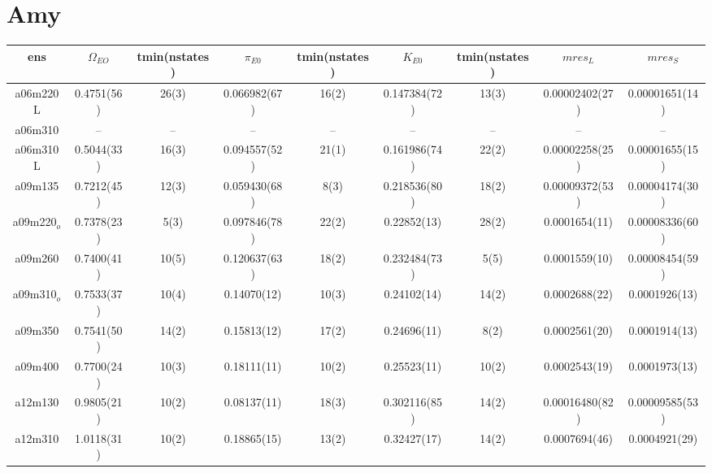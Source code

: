 \documentclass{article}
\begin{document}
\section*{Amy}
 \begin{table}[h!]
  \centering
 \setlength{\arrayrulewidth}{0.5mm}
\setlength{\tabcolsep}{13pt}
\renewcommand{\arraystretch}{2}
 \begin{tabular}{|| c |c | c | c | c | c | c | c | c ||} 
 \hline
 ens &  $\Omega_{EO}$ & tmin(nstates) & $\pi_{E0}$  & tmin(nstates)& $K_{E0}$  & tmin(nstates) & $mres_{L}$ & $mres_{S}$\\ [0.8ex] 
 \hline\hline
 a06m220L 
 & {0.4751(56)}   &   {26(3)} & {0.066982(67)}   & {16(2)}   & {0.147384(72)}  & {13(3)}   & {0.00002402(27)}  & {0.00001651(14)} \\ 
 \hline
 a06m310 
 & {--}   &   {--} & {--}   & {--}   & {--}  & {--}   & {--}  & {--}  \\
 \hline
 a06m310L 
  & {0.5044(33)}   &   {16(3)} & {0.094557(52)}   & {21(1)}   & {0.161986(74)}  & {22(2)}   & {0.00002258(25)}  & {0.00001655(15)}  \\
 \hline
 a09m135 
  & {0.7212(45)}   &   {12(3)} & {0.059430(68)}   & {8(3)}   & {0.218536(80)}  & {18(2)}   & {0.00009372(53)}  & {0.00004174(30)}   \\
 \hline
 a09m220$_o$ 
 & {0.7378(23)}   &   {5(3)} & {0.097846(78)}   & {22(2)}   & {0.22852(13)}  & {28(2)}   & {0.0001654(11)}  & {0.00008336(60)} \\
 \hline
 a09m260
  & {0.7400(41)}   &   {10(5)} & {0.120637(63)}   & {18(2)}   & {0.232484(73)}  & {5(5)}   & {0.0001559(10)}  & {0.00008454(59)} \\
 \hline
 a09m310$_o$
  & {0.7533(37)}   &   {10(4)} & {0.14070(12)}   & {10(3)}   & {0.24102(14)}  & {14(2)}   & {0.0002688(22)}  & {0.0001926(13)} \\
 \hline
 a09m350 
  & {0.7541(50)}   &   {14(2)} & {0.15813(12)}   & {17(2)}   & {0.24696(11)}  & {8(2)}   & {0.0002561(20)}  & {0.0001914(13)} \\
 \hline
 a09m400 
  & {0.7700(24)}   &   {10(3)} & {0.18111(11)}   & {10(2)}   & {0.25523(11)}   & {10(2)}  & {0.0002543(19)}  & {0.0001973(13)}\\
 \hline
a12m130 
  & {0.9805(21)}   &   {10(2)} & {0.08137(11)}   & {18(3)}   & {0.302116(85)}   & {14(2)}  & {0.00016480(82)}  & {0.00009585(53)}\\
 \hline
 a12m310 
  & {1.0118(31)}   &   {10(2)} & {0.18865(15)}   & {13(2)}   & {0.32427(17)}  & {14(2)}  & {0.0007694(46)}  & {0.0004921(29)} \\
 \hline

 
 \end{tabular}
\end{table}
\end{document}
